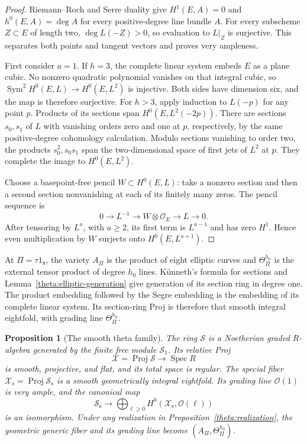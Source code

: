 \documentclass[11pt]{article}
\newtheorem{proposition}[theorem]{Proposition}
\theoremstyle{definition}
\theoremstyle{remark}
\DeclareMathOperator{\Spec}{Spec}
\DeclareMathOperator{\Proj}{Proj}
\newcommand{\cO}{\mathcal O}
\numberwithin{equation}{section}
\begin{document}
\begin{proof}
Riemann--Roch and Serre duality give $H^1(E,A)=0$ and
$h^0(E,A)=\deg A$ for every positive-degree line bundle $A$.
For every subscheme $Z\subset E$ of length two,
$\deg L(-Z)>0$, so evaluation to $L|_Z$ is surjective.
This separates both points and tangent vectors and proves very ampleness.

First consider $a=1$.  If $h=3$, the complete linear system embeds $E$
as a plane cubic.  No nonzero quadratic polynomial vanishes on that
integral cubic, so
$\operatorname{Sym}^2H^0(E,L)\to H^0(E,L^2)$ is injective.
Both sides have dimension six, and the map is therefore surjective.
For $h>3$, apply induction to $L(-p)$ for any point $p$.
Products of its sections span $H^0(E,L^2(-2p))$.
There are sections $s_0,s_1$ of $L$ with vanishing orders zero and one at
$p$, respectively, by the same positive-degree cohomology calculation.
Modulo sections vanishing to order two, the products $s_0^2,s_0s_1$
span the two-dimensional space of first jets of $L^2$ at $p$.
They complete the image to $H^0(E,L^2)$.

Choose a basepoint-free pencil $W\subset H^0(E,L)$: take a nonzero
section and then a second section nonvanishing at each of its finitely
many zeros.  The pencil sequence is
\[
 0\longrightarrow L^{-1}\longrightarrow W\otimes\cO_E
       \longrightarrow L\longrightarrow0.
\]
After tensoring by $L^a$, with $a\geq2$, its first term is $L^{a-1}$
and has zero $H^1$.  Hence even multiplication by $W$ surjects onto
$H^0(E,L^{a+1})$.
\end{proof}

At $\Pi=\tau1_8$, the variety $A_\Pi$ is the product of eight elliptic
curves and $\Theta_\Pi^{h_0}$ is the external tensor product of degree
$h_0$ lines.  K\"unneth's formula for sections and
Lemma~\ref{theta:elliptic-generation} give generation of its section ring
in degree one.  The product embedding followed by the Segre embedding
is the embedding of its complete linear system.  Its section-ring Proj
is therefore that smooth integral eightfold, with grading line
$\Theta_\Pi^{h_0}$.

\begin{proposition}[The smooth theta family]\label{theta:family}
The ring $\mathscr S$ is a Noetherian graded $R$-algebra generated by the
finite free module $\mathscr S_1$.  Its relative Proj
\[
 \mathscr X=\Proj\mathscr S\longrightarrow\Spec R
\]
is smooth, projective, and flat, and its total space is regular.
The special fiber
$\mathscr X_{\mathrm s}=\Proj\mathscr S_{\mathrm s}$ is a smooth
geometrically integral eightfold.  Its grading line $\cO(1)$ is very
ample, and the canonical map
\[
 \mathscr S_{\mathrm s}\longrightarrow
 \bigoplus_{\ell\geq0}H^0(\mathscr X_{\mathrm s},\cO(\ell))
\]
is an isomorphism.  Under any realization in
Proposition~\ref{theta:realization}, the geometric generic fiber and its
grading line become $(A_\Pi,\Theta_\Pi^{h_0})$.
\end{proposition}
\end{document}
